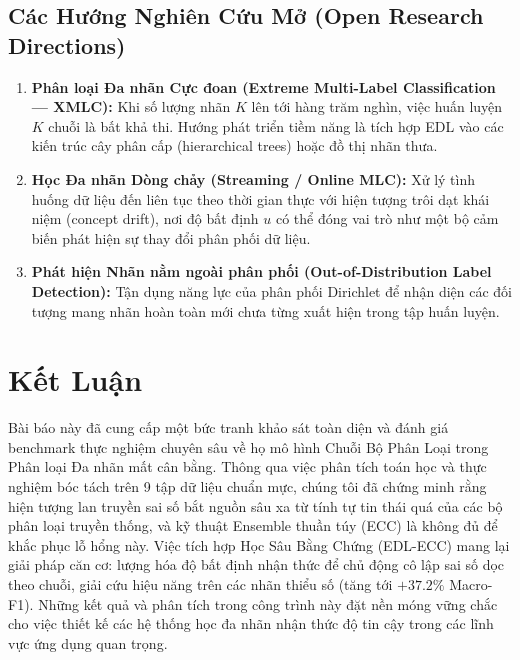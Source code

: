 \documentclass[1p,times]{elsarticle}
\begin{document}
\subsection{Các Hướng Nghiên Cứu Mở (Open Research Directions)}
\begin{enumerate}
    \item \textbf{Phân loại Đa nhãn Cực đoan (Extreme Multi-Label Classification — XMLC):} Khi số lượng nhãn $K$ lên tới hàng trăm nghìn, việc huấn luyện $K$ chuỗi là bất khả thi. Hướng phát triển tiềm năng là tích hợp EDL vào các kiến trúc cây phân cấp (hierarchical trees) hoặc đồ thị nhãn thưa.
    \item \textbf{Học Đa nhãn Dòng chảy (Streaming / Online MLC):} Xử lý tình huống dữ liệu đến liên tục theo thời gian thực với hiện tượng trôi dạt khái niệm (concept drift), nơi độ bất định $u$ có thể đóng vai trò như một bộ cảm biến phát hiện sự thay đổi phân phối dữ liệu.
    \item \textbf{Phát hiện Nhãn nằm ngoài phân phối (Out-of-Distribution Label Detection):} Tận dụng năng lực của phân phối Dirichlet để nhận diện các đối tượng mang nhãn hoàn toàn mới chưa từng xuất hiện trong tập huấn luyện.
\end{enumerate}

\section{Kết Luận}
\label{sec:conclusion}

Bài báo này đã cung cấp một bức tranh khảo sát toàn diện và đánh giá benchmark thực nghiệm chuyên sâu về họ mô hình Chuỗi Bộ Phân Loại trong Phân loại Đa nhãn mất cân bằng. Thông qua việc phân tích toán học và thực nghiệm bóc tách trên 9 tập dữ liệu chuẩn mực, chúng tôi đã chứng minh rằng hiện tượng lan truyền sai số bắt nguồn sâu xa từ tính tự tin thái quá của các bộ phân loại truyền thống, và kỹ thuật Ensemble thuần túy (ECC) là không đủ để khắc phục lỗ hổng này. Việc tích hợp Học Sâu Bằng Chứng (EDL-ECC) mang lại giải pháp căn cơ: lượng hóa độ bất định nhận thức để chủ động cô lập sai số dọc theo chuỗi, giải cứu hiệu năng trên các nhãn thiểu số (tăng tới $+37.2\%$ Macro-F1). Những kết quả và phân tích trong công trình này đặt nền móng vững chắc cho việc thiết kế các hệ thống học đa nhãn nhận thức độ tin cậy trong các lĩnh vực ứng dụng quan trọng.
\end{document}
